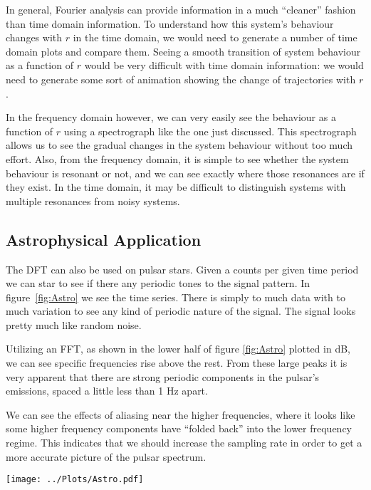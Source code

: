 \documentclass[twocolumn]{myarticle}
\begin{document}
In general, Fourier analysis can provide information in a much ``cleaner'' fashion than time domain information.
To understand how this system's behaviour changes with $ r $ in the time domain, we would need to generate a number of time domain plots and compare them.
Seeing a smooth transition of system behaviour as a function of $ r $ would be very difficult with time domain information: we would need to generate some sort of animation showing the change of trajectories with $ r $.

In the frequency domain however, we can very easily see the behaviour as a function of $ r $ using a spectrograph like the one just discussed.
This spectrograph allows us to see the gradual changes in the system behaviour without too much effort.
Also, from the frequency domain, it is simple to see whether the system behaviour is resonant or not, and we can see exactly where those resonances are if they exist.
In the time domain, it may be difficult to distinguish systems with multiple resonances from noisy systems.

\subsection{Astrophysical Application}
The DFT can also be used on pulsar stars. 
Given a counts per given time period we can star to see if there any periodic tones to the signal pattern. 
In figure~\ref{fig:Astro} we see the time series. 
There is simply to much data with to much variation to see any kind of periodic nature of the signal. 
The signal looks pretty much like random noise.

Utilizing an FFT, as shown in the lower half of figure \ref{fig:Astro} plotted in dB, we can see specific frequencies rise above the rest. 
From these large peaks it is very apparent that there are strong periodic components in the pulsar's emissions, spaced a little less than 1 Hz apart.

We can see the effects of aliasing near the higher frequencies, where it looks like some higher frequency components have ``folded back'' into the lower frequency regime.
This indicates that we should increase the sampling rate in order to get a more accurate picture of the pulsar spectrum.

\begin{figure*}[htb]
    \centering
    \texttt{[image: ../Plots/Astro.pdf]}
    \caption{The time series and the DFT of the pulsar star signal}
    \label{fig:Astro}
\end{figure*}
\end{document}
